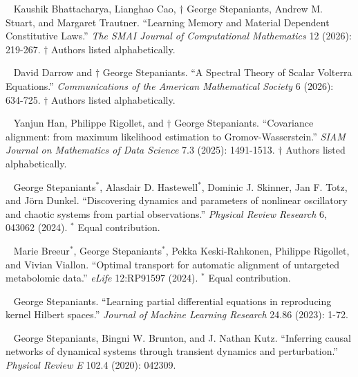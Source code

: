 \documentclass[a4paper,10pt]{article}
\newcommand{\faPaperclip}{{\ResumeLinkFont\symbol{"F0C6}}}
\begin{document}
\begin{enumerate}[label={[J\arabic*]}, leftmargin=*]
\item \href{\detokenize{https://smai-jcm.centre-mersenne.org/articles/10.5802/smai-jcm.148/}}{\faPaperclip}~ Kaushik Bhattacharya, Lianghao Cao, $\dagger$ George Stepaniants, Andrew M. Stuart, and Margaret Trautner. ``Learning Memory and Material Dependent Constitutive Laws.'' \textit{The SMAI Journal of Computational Mathematics} 12 (2026): 219-267. $\dagger$ Authors listed alphabetically.

\item \href{\detokenize{https://doi.org/10.1090/cams/64}}{\faPaperclip}~ David Darrow and $\dagger$ George Stepaniants. ``A Spectral Theory of Scalar Volterra Equations.'' \textit{Communications of the American Mathematical Society} 6 (2026): 634-725. $\dagger$ Authors listed alphabetically.

\item \href{\detokenize{https://epubs.siam.org/doi/full/10.1137/24M1682841}}{\faPaperclip}~ Yanjun Han, Philippe Rigollet, and $\dagger$ George Stepaniants. ``Covariance alignment: from maximum likelihood estimation to Gromov-Wasserstein.'' \textit{SIAM Journal on Mathematics of Data Science} 7.3 (2025): 1491-1513. $\dagger$ Authors listed alphabetically.

\item \href{\detokenize{https://journals.aps.org/prresearch/abstract/10.1103/PhysRevResearch.6.043062}}{\faPaperclip}~ George Stepaniants$^*$, Alasdair D. Hastewell$^*$, Dominic J. Skinner, Jan F. Totz, and Jörn Dunkel. ``Discovering dynamics and parameters of nonlinear oscillatory and chaotic systems from partial observations.'' \textit{Physical Review Research} 6, 043062 (2024). $^*$ Equal contribution.

\item \href{\detokenize{https://elifesciences.org/articles/91597}}{\faPaperclip}~ Marie Breeur$^*$, George Stepaniants$^*$, Pekka Keski-Rahkonen, Philippe Rigollet, and Vivian Viallon. ``Optimal transport for automatic alignment of untargeted metabolomic data.'' \textit{eLife} 12:RP91597 (2024). $^*$ Equal contribution.

\item \href{\detokenize{https://jmlr.org/papers/v24/21-1363.html}}{\faPaperclip}~ George Stepaniants. ``Learning partial differential equations in reproducing kernel Hilbert spaces.'' \textit{Journal of Machine Learning Research} 24.86 (2023): 1-72.

\item \href{\detokenize{https://journals.aps.org/pre/abstract/10.1103/PhysRevE.102.042309}}{\faPaperclip}~ George Stepaniants, Bingni W. Brunton, and J. Nathan Kutz. ``Inferring causal networks of dynamical systems through transient dynamics and perturbation.'' \textit{Physical Review E} 102.4 (2020): 042309.
\end{enumerate}
\end{document}
